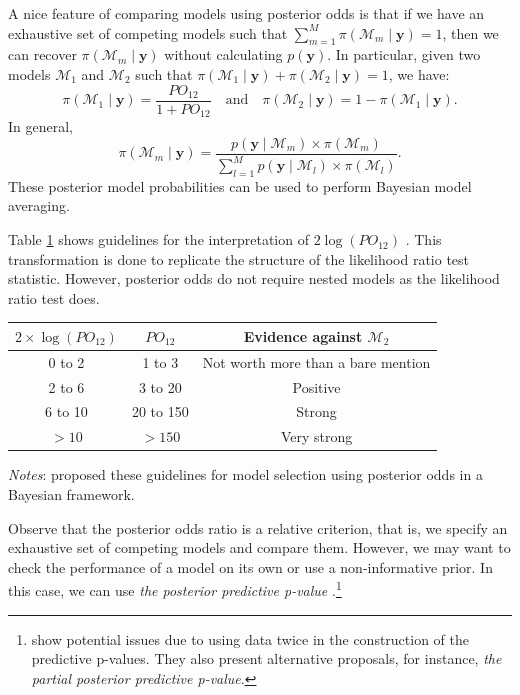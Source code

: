 A nice feature of comparing models using posterior odds is that if we have an exhaustive set of competing models such that \( \sum_{m=1}^M \pi(\mathcal{M}_m \mid \mathbf{y}) = 1 \), then we can recover \( \pi(\mathcal{M}_m \mid \mathbf{y}) \) without calculating \( p(\mathbf{y}) \). In particular, given two models \( \mathcal{M}_1 \) and \( \mathcal{M}_2 \) such that \( \pi(\mathcal{M}_1 \mid \mathbf{y}) + \pi(\mathcal{M}_2 \mid \mathbf{y}) = 1 \), we have:
\[
\pi(\mathcal{M}_1 \mid \mathbf{y}) = \frac{PO_{12}}{1 + PO_{12}} \quad \text{and} \quad \pi(\mathcal{M}_2 \mid \mathbf{y}) = 1 - \pi(\mathcal{M}_1 \mid \mathbf{y}).
\]
In general,
\[
\pi(\mathcal{M}_m \mid \mathbf{y}) = \frac{p(\mathbf{y} \mid \mathcal{M}_m) \times \pi(\mathcal{M}_m)}{\sum_{l=1}^M p(\mathbf{y} \mid \mathcal{M}_l) \times \pi(\mathcal{M}_l)}.
\]
These posterior model probabilities can be used to perform Bayesian model averaging.

Table \ref{tab:guide} shows guidelines for the interpretation of \( 2\log(PO_{12}) \) \cite{Kass1995}. This transformation is done to replicate the structure of the likelihood ratio test statistic. However, posterior odds do not require nested models as the likelihood ratio test does.

\begin{table}%
	\label{tab:guide}%
	\begin{tabular}{ccc}
		\textbf{$2\times\log(PO_{12})$}    & \textbf{$PO_{12}$} & \textbf{Evidence against $\mathcal{M}_2$} \\
		\hline
		0 to 2 & 1 to 3 & Not worth more than a bare mention\\
		2 to 6 & 3 to 20 & Positive\\
		6 to 10 & 20 to 150 & Strong\\
		$> 10$  & $> 150$ & Very strong\\
	\end{tabular}
				\begin{tablenotes}
	\footnotesize \textit{Notes}: \cite{Kass1995} proposed these guidelines for model selection using posterior odds in a Bayesian framework.\\
\end{tablenotes}
\end{table}
Observe that the posterior odds ratio is a relative criterion, that is, we specify an exhaustive set of competing models and compare them. However, we may want to check the performance of a model on its own or use a non-informative prior. In this case, we can use \textit{the posterior predictive p-value} \cite{Gelman1996,gelman1996posterior}.\footnote{\cite{Bayarri2000} show potential issues due to using data twice in the construction of the predictive p-values. They also present alternative proposals, for instance, \textit{the partial posterior predictive p-value}.}

